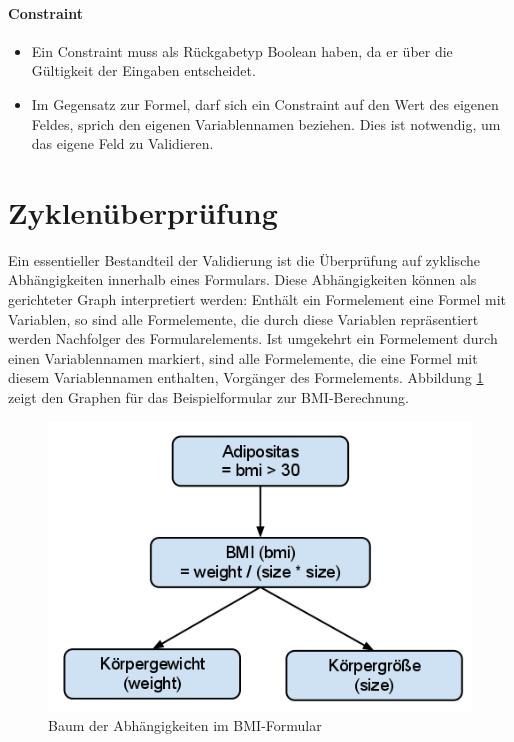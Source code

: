 \paragraph{Constraint}
\begin{itemize}
	\item Ein Constraint muss als Rückgabetyp Boolean haben, da er über die Gültigkeit der Eingaben entscheidet.
	\item Im Gegensatz zur Formel, darf sich ein Constraint auf den Wert des eigenen Feldes, sprich den eigenen Variablennamen beziehen. Dies ist not\-wen\-dig, um das eigene Feld zu Validieren.
	
\end{itemize}

\section{Zyklenüberprüfung}
\label{implementierung_zyklenueberpruefung}

Ein essentieller Bestandteil der Validierung ist die Überprüfung auf zyklische Abhängigkeiten innerhalb eines Formulars. Diese Abhängigkeiten können als gerichteter Graph interpretiert werden: Enthält ein Formelement eine Formel mit Variablen, so sind alle Formelemente, die durch diese Variablen repräsentiert werden Nachfolger des Formularelements. Ist umgekehrt ein Formelement durch einen Variablennamen markiert, sind alle Formelemente, die eine Formel mit diesem Variablennamen enthalten, Vorgänger des Formelements. Abbildung \ref{abb_cycle_bmi_tree} zeigt den Graphen für das Beispielformular zur BMI-Berechnung.

\begin{figure}[ht]
\begin{center}
 \includegraphics[scale=0.5]{figures/cycle_bmi_tree}
\end{center}
\caption{Baum der Abhängigkeiten im BMI-Formular}
\label{abb_cycle_bmi_tree}
\end{figure}

